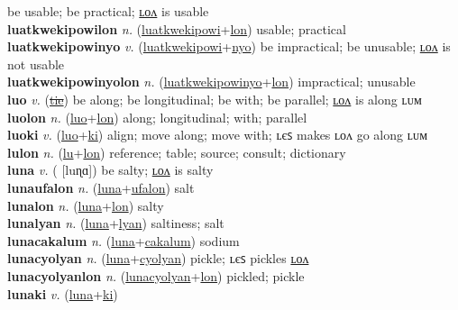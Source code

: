 be usable; be practical; \hyperref[luatkwekipowilon]{ʟᴏᴧ} is usable \label{luatkwekipowi} \\
\textbf{luatkwekipowilon} \textit{n.} (\hyperref[luatkwekipowi]{luatkwekipowi}+\hyperref[lon]{lon})
usable; practical \label{luatkwekipowilon} \\
\textbf{luatkwekipowinyo} \textit{v.} (\hyperref[luatkwekipowi]{luatkwekipowi}+\hyperref[nyo]{nyo})
be impractical; be unusable; \hyperref[luatkwekipowinyolon]{ʟᴏᴧ} is not usable \label{luatkwekipowinyo} \\
\textbf{luatkwekipowinyolon} \textit{n.} (\hyperref[luatkwekipowinyo]{luatkwekipowinyo}+\hyperref[lon]{lon})
impractical; unusable \label{luatkwekipowinyolon} \\
\textbf{luo} \textit{v.} (\hyperref[tie]{\sout{tie}})
be along; be longitudinal; be with; be parallel; \hyperref[luolon]{ʟᴏᴧ} is along ʟᴜᴍ \label{luo} \\
\textbf{luolon} \textit{n.} (\hyperref[luo]{luo}+\hyperref[lon]{lon})
along; longitudinal; with; parallel \label{luolon} \\
\textbf{luoki} \textit{v.} (\hyperref[luo]{luo}+\hyperref[ki]{ki})
align; move along; move with; ʟєꜱ makes ʟᴏᴧ go along ʟᴜᴍ \label{luoki} \\
\textbf{lulon} \textit{n.} (\hyperref[lu]{lu}+\hyperref[lon]{lon})
reference; table; source; consult; dictionary \label{lulon} \\
\textbf{luna} \textit{v.} ( [luɳɑ])
be salty; \hyperref[lunalon]{ʟᴏᴧ} is salty \label{luna} \\
\textbf{lunaufalon} \textit{n.} (\hyperref[luna]{luna}+\hyperref[ufalon]{ufalon})
salt \label{lunaufalon} \\
\textbf{lunalon} \textit{n.} (\hyperref[luna]{luna}+\hyperref[lon]{lon})
salty \label{lunalon} \\
\textbf{lunalyan} \textit{n.} (\hyperref[luna]{luna}+\hyperref[lyan]{lyan})
saltiness; salt \label{lunalyan} \\
\textbf{lunacakalum} \textit{n.} (\hyperref[luna]{luna}+\hyperref[cakalum]{cakalum})
sodium \label{lunacakalum} \\
\textbf{lunacyolyan} \textit{n.} (\hyperref[luna]{luna}+\hyperref[cyolyan]{cyolyan})
pickle; ʟєꜱ pickles \hyperref[lunacyolyanlon]{ʟᴏᴧ} \label{lunacyolyan} \\
\textbf{lunacyolyanlon} \textit{n.} (\hyperref[lunacyolyan]{lunacyolyan}+\hyperref[lon]{lon})
pickled; pickle \label{lunacyolyanlon} \\
\textbf{lunaki} \textit{v.} (\hyperref[luna]{luna}+\hyperref[ki]{ki})
